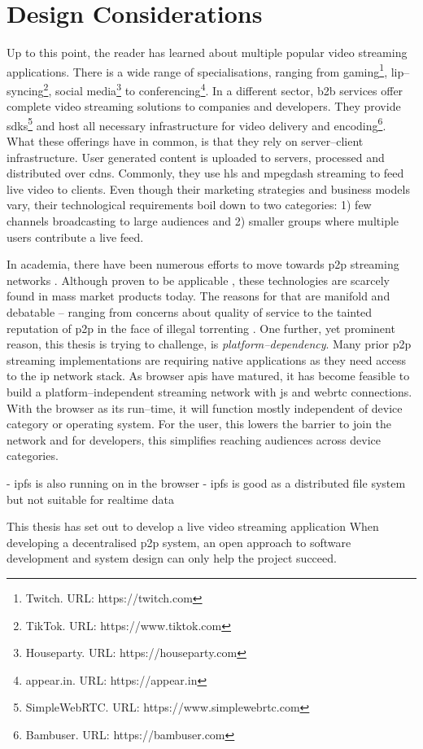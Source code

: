 \section{Design Considerations}

Up to this point, the reader has learned about multiple popular video streaming applications. There is a wide range of specialisations, ranging from gaming\footnote{Twitch. URL: {https://twitch.com}}, lip–syncing\footnote{TikTok. URL: {https://www.tiktok.com}}, social media\footnote{Houseparty. URL: {https://houseparty.com}} to conferencing\footnote{appear.in. URL: {https://appear.in}}. In a different sector, \gls{b2b} services offer complete video streaming solutions to companies and developers. They provide \glspl{sdk}\footnote{SimpleWebRTC. URL: {https://www.simplewebrtc.com}} and host all necessary infrastructure for video delivery and encoding\footnote{Bambuser. URL: {https://bambuser.com}}. What these offerings have in common, is that they rely on server–client infrastructure. User generated content is uploaded to servers, processed and distributed over \glspl{cdn}. Commonly, they use \gls{hls} and \gls{mpegdash} streaming to feed live video to clients. Even though their marketing strategies and business models vary, their technological requirements boil down to two categories: 1) few channels broadcasting to large audiences and 2) smaller groups where multiple users contribute a live feed.

In academia, there have been numerous efforts to move towards \gls{p2p} streaming networks \cite{anysee, coolstreaming, hlpsp}. Although proven to be applicable \cite{skype-p2p-primer, tox-chat-app}, these technologies are scarcely found in mass market products today. The reasons for that are manifold and debatable – ranging from concerns about quality of service \cite{skype-ditching-p2p} to the tainted reputation of \gls{p2p} in the face of illegal torrenting \cite{p2p-social-impact}. One further, yet prominent reason, this thesis is trying to challenge, is \textit{platform–dependency}. Many prior \gls{p2p} streaming implementations are requiring native applications as they need access to the \gls{ip} network stack. As browser \glspl{api} have matured, it has become feasible to build a platform–independent streaming network with \gls{js} and \gls{webrtc} connections. With the browser as its run–time, it will function mostly independent of device category or operating system. For the user, this lowers the barrier to join the network and for developers, this simplifies reaching audiences across device categories.


- ipfs is also running on in the browser
- ipfs is good as a distributed file system but not suitable for realtime data

This thesis has set out to develop a live video streaming application
When developing a decentralised \gls{p2p} system, an open approach to software development and system design can only help the project succeed.
